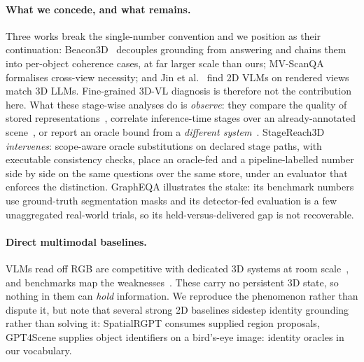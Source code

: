 \paragraph{What we concede, and what remains.}
Three works break the single-number convention and we position as their continuation:
Beacon3D~\cite{huang2025beacon3d} decouples grounding from answering and chains them
into per-object coherence cases, at far larger scale than ours;
MV-ScanQA~\cite{mo2025mvscanqa} formalises cross-view necessity; and Jin et
al.~\cite{jin2025revisiting3d} find 2D VLMs on rendered views match 3D LLMs.
Fine-grained 3D-VL diagnosis is therefore not the contribution here. What these
stage-wise analyses do is \emph{observe}: they
compare the quality of stored representations~\cite{gu2024conceptgraphs}, correlate
inference-time stages over an already-annotated scene~\cite{huang2025beacon3d}, or
report an oracle bound from a \emph{different
system}~\cite{azuma2022scanqa, takmaz2023openmask3d}. StageReach3D \emph{intervenes}:
scope-aware oracle substitutions on declared stage paths, with executable consistency
checks, place an oracle-fed and a pipeline-labelled number side by side on the same
questions over the same store, under an evaluator that enforces the distinction.
GraphEQA illustrates the stake: its benchmark numbers use ground-truth segmentation
masks and its detector-fed evaluation is a few unaggregated real-world trials, so its
held-versus-delivered gap is not recoverable.

\paragraph{Direct multimodal baselines.}
VLMs read off RGB are competitive with dedicated 3D systems at room
scale~\cite{qi2026gpt4scene, chen2024spatialvlm, cheng2024spatialrgpt}, and benchmarks
map the weaknesses~\cite{fu2024blink, yang2025thinkinginspace, yeh2026allangles,
yang2026mmsibench, kamath2023whatsup, ma2025srbench, xie2026spatialqa}. These carry no
persistent 3D state, so nothing in them can \emph{hold} information. We reproduce the
phenomenon rather than dispute it, but note that several strong 2D baselines sidestep
identity grounding rather than solving it: SpatialRGPT consumes supplied region
proposals, GPT4Scene supplies object identifiers on a bird's-eye image: identity
oracles in our vocabulary.

